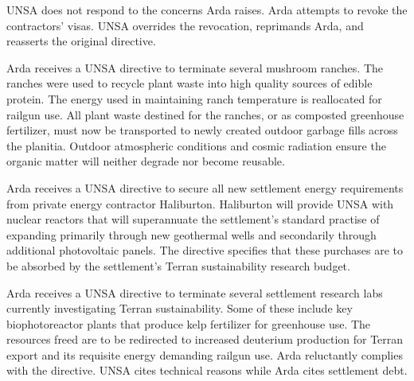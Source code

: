 UNSA does not respond to the concerns Arda raises. Arda attempts to revoke the contractors' visas. UNSA overrides the revocation, reprimands Arda, and reasserts the original directive.
\StopTimelineDate

Arda receives a UNSA directive to terminate several mushroom ranches. The ranches were used to recycle plant waste into high quality sources of edible protein. The energy used in maintaining ranch temperature is reallocated for railgun use. All plant waste destined for the ranches, or as composted greenhouse fertilizer, must now be transported to newly created outdoor garbage fills across the planitia. Outdoor atmospheric conditions and cosmic radiation ensure the organic matter will neither degrade nor become reusable.
\StopTimelineDate

Arda receives a UNSA directive to secure all new settlement energy requirements from private energy contractor Haliburton. Haliburton will provide UNSA with nuclear reactors that will superannuate the settlement's standard practise of expanding primarily through new geothermal wells and secondarily through additional photovoltaic panels. The directive specifies that these purchases are to be absorbed by the settlement's Terran sustainability research budget.
\StopTimelineDate

Arda receives a UNSA directive to terminate several settlement research labs currently investigating Terran sustainability. Some of these include key biophotoreactor plants that produce kelp fertilizer for greenhouse use. The resources freed are to be redirected to increased deuterium production for Terran export and its requisite energy demanding railgun use. Arda reluctantly complies with the directive. UNSA cites technical reasons while Arda cites settlement debt.
\StopTimelineDate

